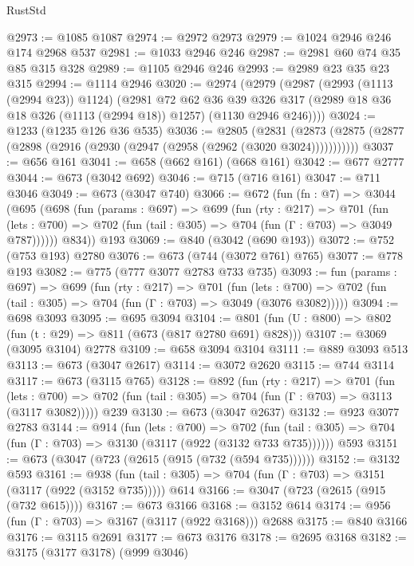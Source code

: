 \begin{lexlean}{RustStd}
\begin{coremodule}
@2973 := @1085 @1087
@2974 := @2972 @2973
@2979 := @1024 @2946 @246 @174 @2968 @537
@2981 := @1033 @2946 @246
@2987 := @2981 @60 @74 @35 @85 @315 @328
@2989 := @1105 @2946 @246
@2993 := @2989 @23 @35 @23 @315
@2994 := @1114 @2946
@3020 := @2974
    (@2979
      (@2987
        (@2993 (@1113 (@2994 @23)) @1124)
        (@2981
          @72
          @62
          @36
          @39
          @326
          @317
          (@2989 @18 @36 @18 @326 (@1113 (@2994 @18)) @1257)
          (@1130 @2946 @246))))
@3024 := @1233 (@1235 @126 @36 @535)
@3036 := @2805
    (@2831 (@2873 (@2875 (@2877 (@2898 (@2916 (@2930 (@2947 (@2958 (@2962 (@3020 @3024)))))))))))
@3037 := @656 @161
@3041 := @658 (@662 @161) (@668 @161)
@3042 := @677 @2777
@3044 := @673 (@3042 @692)
@3046 := @715 (@716 @161)
@3047 := @711 @3046
@3049 := @673 (@3047 @740)
@3066 := @672
    (fun (fn : @7) =>
    @3044
      (@695
        (@698
          (fun (params : @697) =>
          @699
            (fun (rty : @217) =>
            @701
              (fun (lets : @700) =>
              @702 (fun (tail : @305) => @704 (fun (Γ : @703) => @3049 @787))))))
        @834))
    @193
@3069 := @840 (@3042 (@690 @193))
@3072 := @752 (@753 @193) @2780
@3076 := @673 (@744 (@3072 @761) @765)
@3077 := @778 @193
@3082 := @775 (@777 @3077 @2783 @733 @735)
@3093 := fun (params : @697) =>
  @699
    (fun (rty : @217) =>
    @701
      (fun (lets : @700) =>
      @702 (fun (tail : @305) => @704 (fun (Γ : @703) => @3049 (@3076 @3082)))))
@3094 := @698 @3093
@3095 := @695 @3094
@3104 := @801 (fun (U : @800) => @802 (fun (t : @29) => @811 (@673 (@817 @2780 @691) @828)))
@3107 := @3069 (@3095 @3104) @2778
@3109 := @658 @3094 @3104
@3111 := @889 @3093 @513
@3113 := @673 (@3047 @2617)
@3114 := @3072 @2620
@3115 := @744 @3114
@3117 := @673 (@3115 @765)
@3128 := @892
    (fun (rty : @217) =>
    @701
      (fun (lets : @700) =>
      @702 (fun (tail : @305) => @704 (fun (Γ : @703) => @3113 (@3117 @3082)))))
    @239
@3130 := @673 (@3047 @2637)
@3132 := @923 @3077 @2783
@3144 := @914
    (fun (lets : @700) =>
    @702 (fun (tail : @305) => @704 (fun (Γ : @703) => @3130 (@3117 (@922 (@3132 @733 @735))))))
    @593
@3151 := @673 (@3047 (@723 (@2615 (@915 (@732 (@594 @735))))))
@3152 := @3132 @593
@3161 := @938 (fun (tail : @305) => @704 (fun (Γ : @703) => @3151 (@3117 (@922 (@3152 @735))))) @614
@3166 := @3047 (@723 (@2615 (@915 (@732 @615))))
@3167 := @673 @3166
@3168 := @3152 @614
@3174 := @956 (fun (Γ : @703) => @3167 (@3117 (@922 @3168))) @2688
@3175 := @840 @3166
@3176 := @3115 @2691
@3177 := @673 @3176
@3178 := @2695 @3168
@3182 := @3175 (@3177 @3178) (@999 @3046)

\end{coremodule}
\end{lexlean}
